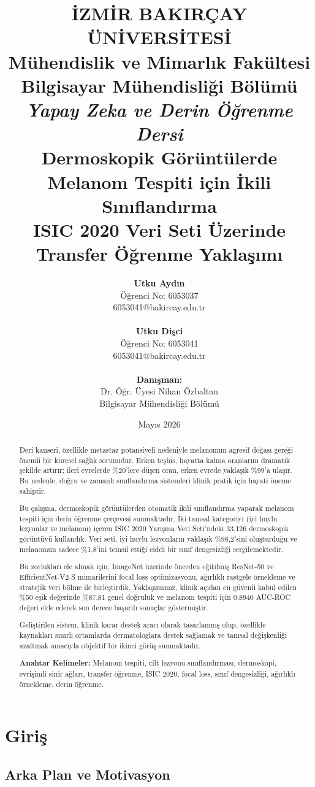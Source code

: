 \documentclass[12pt,a4paper]{article}
\title{
    \large\textbf{İZMİR BAKIRÇAY ÜNİVERSİTESİ}\\
    \large Mühendislik ve Mimarlık Fakültesi\\
    \large Bilgisayar Mühendisliği Bölümü\\
    \vspace{0.5cm}
    \large\textit{Yapay Zeka ve Derin Öğrenme Dersi}\\
    \vspace{1.5cm}
    \huge\textbf{Dermoskopik Görüntülerde Melanom Tespiti için İkili Sınıflandırma}\\
    \vspace{0.5cm}
    \large\textbf{ISIC 2020 Veri Seti Üzerinde Transfer Öğrenme Yaklaşımı}
}
\author{
    \textbf{Utku Aydın}\\
    Öğrenci No: 6053037\\
    6053041@bakircay.edu.tr\\
    \\
    \textbf{Utku Dişci}\\
    Öğrenci No: 6053041\\
    6053041@bakircay.edu.tr\\
    \\
    \textbf{Danışman:}\\
    Dr. Öğr. Üyesi Nihan Özbaltan\\
    Bilgisayar Mühendisliği Bölümü
}
\date{Mayıs 2026}
\begin{document}
\maketitle
\newpage

\begin{abstract}
\noindent Deri kanseri, özellikle metastaz potansiyeli nedeniyle melanomun agresif doğası gereği önemli bir küresel sağlık sorunudur. Erken teşhis, hayatta kalma oranlarını dramatik şekilde artırır; ileri evrelerde \%20'lere düşen oran, erken evrede yaklaşık \%99'a ulaşır. Bu nedenle, doğru ve zamanlı sınıflandırma sistemleri klinik pratik için hayati öneme sahiptir.

Bu çalışma, dermoskopik görüntülerden otomatik ikili sınıflandırma yaparak melanom tespiti için derin öğrenme çerçevesi sunmaktadır. İki tanısal kategoriyi (iyi huylu lezyonlar ve melanom) içeren ISIC 2020 Yarışma Veri Seti'ndeki 33.126 dermoskopik görüntüyü kullandık. Veri seti, iyi huylu lezyonların yaklaşık \%98,2'sini oluşturduğu ve melanomun sadece \%1,8'ini temsil ettiği ciddi bir sınıf dengesizliği sergilemektedir.

Bu zorlukları ele almak için, ImageNet üzerinde önceden eğitilmiş ResNet-50 ve EfficientNet-V2-S mimarilerini focal loss optimizasyonu, ağırlıklı rastgele örnekleme ve stratejik veri bölme ile birleştirdik. Yaklaşımımız, klinik açıdan en güvenli kabul edilen \%50 eşik değerinde \%87,81 genel doğruluk ve melanom tespiti için 0,8940 AUC-ROC değeri elde ederek son derece başarılı sonuçlar göstermiştir.

Geliştirilen sistem, klinik karar destek aracı olarak tasarlanmış olup, özellikle kaynakları sınırlı ortamlarda dermatologlara destek sağlamak ve tanısal değişkenliği azaltmak amacıyla objektif bir ikinci görüş sunmaktadır.
\vspace{0.5cm}

\noindent\textbf{Anahtar Kelimeler:} Melanom tespiti, cilt lezyonu sınıflandırması, dermoskopi, evrişimli sinir ağları, transfer öğrenme, ISIC 2020, focal loss, sınıf dengesizliği, ağırlıklı örnekleme, derin öğrenme.
\end{abstract}

\newpage

\section{Giriş}
\label{sec:giris}

\subsection{Arka Plan ve Motivasyon}
\label{subsec:arka_plan}
\end{document}
